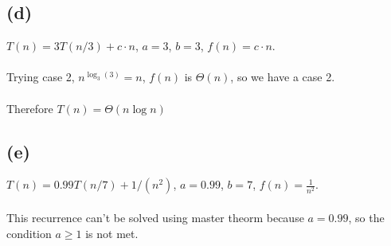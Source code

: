 \documentclass[]{article}
\begin{document}
\subsection*{(d)}
$T(n) = 3T(n/3) + c \cdot n$, $a=3$, $b=3$, $f(n) = c \cdot n$.
\\
\\
Trying case 2, $n^{\log_3 (3)} = n$, $f(n)$ is $\Theta (n)$, so we have a case 2.
\\
\\
Therefore $T(n) = \Theta (n \log n)$
\subsection*{(e)}
$T(n) = 0.99T(n/7) + 1/(n^2)$, $a=0.99$, $b=7$, $f(n) = \frac{1}{n^2}$.
\\
\\
This recurrence can't be solved using master theorm because $a= 0.99$, so the condition $a \geq 1$ is not met.
\end{document}
